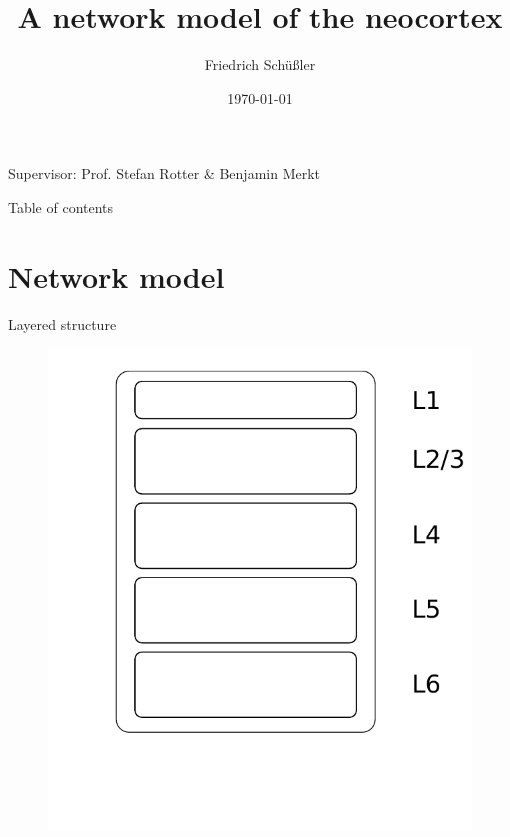 \documentclass[xcolor=x11names,compress]{beamer}
\renewcommand{\(}{\begin{columns}}
\renewcommand{\)}{\end{columns}}
\newcommand{\<}[1]{\begin{column}{#1}}
\renewcommand{\>}{\end{column}}
\begin{document}
\begin{frame}{}
\title[Neocortex]{A network model of the neocortex}
\author{
Friedrich Schüßler}
\date{\today}
\titlepage

\centering 
Supervisor: Prof. Stefan Rotter \& Benjamin Merkt
\end{frame}

\begin{frame}{Table of contents}
    \tableofcontents
\end{frame}



%

\section{Network model}
\begin{frame}[t]{Layered structure}
\begin{figure}[htpb]
    \centering
    \includegraphics[width=0.5\linewidth]{../figures/microcircuit_model_pre}
\label{fig:model_0}
\end{figure}
\end{frame}
\end{document}
